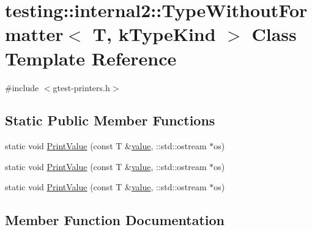 \hypertarget{classtesting_1_1internal2_1_1_type_without_formatter}{}\section{testing\+::internal2\+::Type\+Without\+Formatter$<$ T, k\+Type\+Kind $>$ Class Template Reference}
\label{classtesting_1_1internal2_1_1_type_without_formatter}


{\ttfamily \#include $<$gtest-\/printers.\+h$>$}

\subsection*{Static Public Member Functions}
\begin{DoxyCompactItemize}
\item 
static void \mbox{\hyperlink{classtesting_1_1internal2_1_1_type_without_formatter_a6651f6f7be2c0f899729eeb6038f76d3}{Print\+Value}} (const T \&\mbox{\hyperlink{_obj__test_2lib_2googletest-master_2googlemock_2test_2gmock-matchers__test_8cc_a337b8a670efc0b086ad3af163f3121b6}{value}}, \+::std\+::ostream $\ast$os)
\item 
static void \mbox{\hyperlink{classtesting_1_1internal2_1_1_type_without_formatter_a6651f6f7be2c0f899729eeb6038f76d3}{Print\+Value}} (const T \&\mbox{\hyperlink{_obj__test_2lib_2googletest-master_2googlemock_2test_2gmock-matchers__test_8cc_a337b8a670efc0b086ad3af163f3121b6}{value}}, \+::std\+::ostream $\ast$os)
\item 
static void \mbox{\hyperlink{classtesting_1_1internal2_1_1_type_without_formatter_a6651f6f7be2c0f899729eeb6038f76d3}{Print\+Value}} (const T \&\mbox{\hyperlink{_obj__test_2lib_2googletest-master_2googlemock_2test_2gmock-matchers__test_8cc_a337b8a670efc0b086ad3af163f3121b6}{value}}, \+::std\+::ostream $\ast$os)
\end{DoxyCompactItemize}


\subsection{Member Function Documentation}
\mbox{\label{classtesting_1_1internal2_1_1_type_without_formatter_a6651f6f7be2c0f899729eeb6038f76d3}} 
